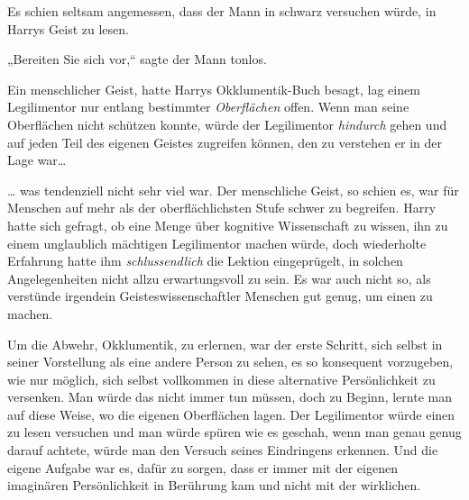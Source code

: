 Es schien seltsam angemessen, dass der Mann in schwarz versuchen würde, in Harrys Geist zu lesen.

„Bereiten Sie sich vor,“ sagte der Mann tonlos.

Ein menschlicher Geist, hatte Harrys Okklumentik-Buch besagt, lag einem Legilimentor nur entlang bestimmter \emph{Oberflächen} offen. Wenn man seine Oberflächen nicht schützen konnte, würde der Legilimentor \emph{hindurch} gehen und auf jeden Teil des eigenen Geistes zugreifen können, den zu verstehen er in der Lage war…

… was tendenziell nicht sehr viel war. Der menschliche Geist, so schien es, war für Menschen auf mehr als der oberflächlichsten Stufe schwer zu begreifen. Harry hatte sich gefragt, ob eine Menge über kognitive Wissenschaft zu wissen, ihn zu einem unglaublich mächtigen Legilimentor machen würde, doch wiederholte Erfahrung hatte ihm \emph{schlussendlich} die Lektion eingeprügelt, in solchen Angelegenheiten nicht allzu erwartungsvoll zu sein. Es war auch nicht so, als verstünde irgendein Geisteswissenschaftler Menschen gut genug, um einen zu machen.

Um die Abwehr, Okklumentik, zu erlernen, war der erste Schritt, sich selbst in seiner Vorstellung als eine andere Person zu sehen, es so konsequent vorzugeben, wie nur möglich, sich selbst vollkommen in diese alternative Persönlichkeit zu versenken. Man würde das nicht immer tun müssen, doch zu Beginn, lernte man auf diese Weise, wo die eigenen Oberflächen lagen. Der Legilimentor würde einen zu lesen versuchen und man würde spüren wie es geschah, wenn man genau genug darauf achtete, würde man den Versuch seines Eindringens erkennen. Und die eigene Aufgabe war es, dafür zu sorgen, dass er immer mit der eigenen imaginären Persönlichkeit in Berührung kam und nicht mit der wirklichen.

